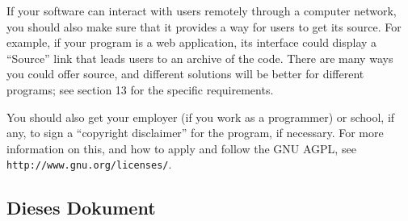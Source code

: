 \documentclass[10pt,a4paper,ngerman,titlepage,tocindentauto]{article}
\begin{document}
\begin{multicols}{3}
{\begin{enumerate}
					If your software can interact with users remotely through a computer
					network, you should also make sure that it provides a way for users to
					get its source.  For example, if your program is a web application, its
					interface could display a ``Source'' link that leads users to an archive
					of the code.  There are many ways you could offer source, and different
					solutions will be better for different programs; see section 13 for the
					specific requirements.

					You should also get your employer (if you work as a programmer) or
					school, if any, to sign a ``copyright disclaimer'' for the program, if
					necessary.  For more information on this, and how to apply and follow
					the GNU AGPL, see \texttt{http://www.gnu.org/licenses/}.

					\end{enumerate}
			}
		\end{multicols}
		
		\subsection{Dieses Dokument}
		
\end{document}
